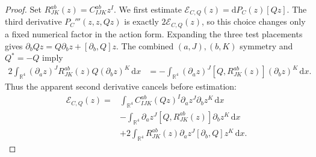 \documentclass[11pt,a4paper]{article}
\numberwithin{equation}{section}
\newcommand{\dd}{\mathrm d}
\newcommand{\R}{\mathbb R}
\theoremstyle{definition}
\begin{document}
\begin{proof}
Set $R^{ab}_{JK}(z)=C_{IJK}^{ab}z^I$. We first estimate
$\mathcal E_{C,Q}(z)=\dd P_C(z)[Qz]$.
The third derivative $P_C'''(z,z,Qz)$ is exactly
$2\mathcal E_{C,Q}(z)$, so this choice changes only a fixed numerical
factor in the action form. Expanding the three test placements gives
$\partial_bQz=Q\partial_bz+[\partial_b,Q]z$.
The combined $(a,J),(b,K)$ symmetry and $Q^*=-Q$ imply
\begin{equation*}
\begin{aligned}
2\int_{\R^4}(\partial_a z)^J R^{ab}_{JK}(z)Q(\partial_b z)^K\,\dd x
&=-\int_{\R^4}(\partial_a z)^J[Q,R^{ab}_{JK}(z)](\partial_b z)^K\,\dd x.
\end{aligned}
\end{equation*}
Thus the apparent second derivative cancels before estimation:
\begin{equation*}
\begin{split}
\mathcal E_{C,Q}(z)
={}&\int_{\R^4} C_{IJK}^{ab}(Qz)^I\partial_a z^J\partial_b z^K\,\dd x\\
 &-\int_{\R^4} \partial_a z^J[Q,R^{ab}_{JK}(z)]\partial_b z^K\,\dd x\\
 &+2\int_{\R^4} R^{ab}_{JK}(z)\partial_a z^J[\partial_b,Q]z^K\,\dd x.
\end{split}
\end{equation*}


\end{proof}
\end{document}

